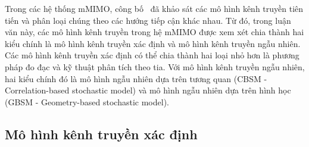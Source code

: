 Trong các hệ thống mMIMO, công bố~\cite{Feng2022} đã khảo sát các mô hình kênh truyền tiên tiến và phân loại chúng theo các hướng tiếp cận khác nhau. Từ đó, trong luận văn này, các mô hình kênh truyền trong hệ mMIMO được xem xét chia thành hai kiểu chính là mô hình kênh truyền xác định và mô hình kênh truyền ngẫu nhiên. Các mô hình kênh truyền xác định có thể chia thành hai loại nhỏ hơn là phương pháp đo đạc và kỹ thuật phân tích theo tia. Với mô hình kênh truyền ngẫu nhiên, hai kiểu chính đó là mô hình ngẫu nhiên dựa trên tương quan (CBSM - Correlation-based stochastic model) và mô hình ngẫu nhiên dựa trên hình học (GBSM - Geometry-based stochastic model).

\subsection{Mô hình kênh truyền xác định}


